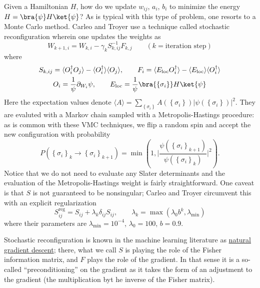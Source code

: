 \documentclass{report}
\begin{document}
Given a Hamiltonian $ H $, how do we update $ w_{ij} $, $ a_i $, $ b_i $
to minimize the energy $ H = \bra{\psi}H\ket{\psi} $? As is typical with 
this type of problem, one resorts to a Monte Carlo method. Carleo and Troyer 
use a technique called stochastic reconfiguration wherein one updates the 
weights as 
\begin{equation*}
	W_{k+1, i}= W_{k,i} - \gamma_k S^{-1}_{k, ij} F_{k, j}
	\qquad (k=\text{iteration step})
\end{equation*}
where 
\begin{gather*}
	S_{k,ij} = \langle O_i^\dagger O_j\rangle - \langle O_i^\dagger\rangle \langle O_j\rangle,\qquad 
	F_{i} = \langle E_{\text{loc}} O_i^\dagger\rangle - \langle E_{\text{loc}}\rangle
		\langle O_i^\dagger \rangle\\
	O_i = \frac{1}{\psi} \partial_{W_i} \psi,\qquad 
	E_{\text{loc}} = \frac{1}{\psi}\bra{\left\{\sigma_i\right\}} H \ket{\psi} 
\end{gather*}
Here the expectation values denote $ \langle A\rangle = \sum_{\left\{\sigma_i\right\}} 
A (\left\{\sigma_i\right\})|\psi(\left\{\sigma_i\right\})|^2 $. They are 
evaluted with a Markov chain sampled with a Metropolis-Hastings procedure:
as is common with these VMC techniques, we flip a random spin and accept the 
new configuration with probability 
\begin{equation*}
	P(\left\{\sigma_i\right\}_k \to \left\{\sigma_i\right\}_{k+1})
		= \min \left(1, \Bigg| \frac{
				\psi(\left\{\sigma_i\right\}_{k+1})
			}{
				\psi(\left\{\sigma_i\right\}_{k})}\Bigg|^2\right).
\end{equation*}
Notice that we do not need to evaluate any Slater determinants and the
evaluation of the Metropolis-Hastings weight is fairly straightforward.
One caveat is that $ S $ is not guaranteed to be nonsingular; Carleo and Troyer 
circumvent this with an explicit regularization 
\begin{equation*}
	S_{ij}^{\text{reg}} = S_{ij} + \lambda_{k} \delta_{ij}S_{ij},\qquad 
	\lambda_{k} = \max (\lambda_0 b^k, \lambda_{\text{min}})
\end{equation*}
where their parameters are $ \lambda_{\text{min}} = 10^{-4}$, $ \lambda_0 = 100 $, 
$ b=0.9 $.

Stochastic reconfiguration is known in the machine learning literature as 
\href{https://agustinus.kristia.de/techblog/2018/03/14/natural-gradient/}{natural 
gradient descent}; there, what we call $ S $ is playing the role of the Fisher 
information matrix, and $ F $ plays the role of the gradient. In that sense it is a 
so-called ``preconditioning'' on the gradient as it takes the form of an 
adjustment to the gradient (the multiplication byt he inverse of the Fisher 
matrix).
\end{document}
